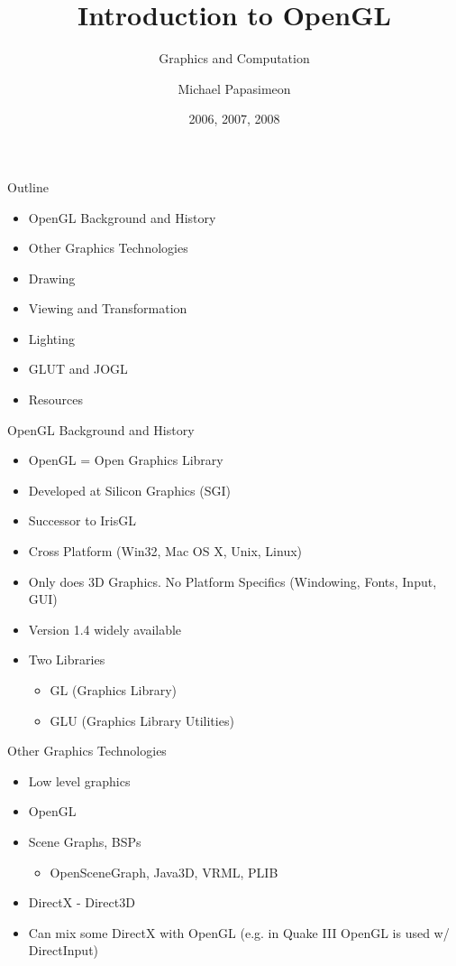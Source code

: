 \documentclass[xcolor=dvipsnames,t]{beamer}
\title[OpenGL]{Introduction to OpenGL}
\subtitle{Graphics and Computation}
\author{Michael Papasimeon} %
\date{2006, 2007, 2008}
\begin{document}
\begin{frame}
    \maketitle
\end{frame} 

\begin{frame}{Outline}
    \begin{itemize}
        \item OpenGL Background and History
        \item Other Graphics Technologies
        \item Drawing
        \item Viewing and Transformation
        \item Lighting
        \item GLUT and JOGL
        \item Resources
    \end{itemize} 
\end{frame}

\begin{frame}{OpenGL Background and History} 
    \begin{itemize}
        \item OpenGL = Open Graphics Library
        \item Developed at Silicon Graphics (SGI)
        \item Successor to IrisGL
        \item Cross Platform (Win32, Mac OS X, Unix, Linux)
        \item Only does 3D Graphics. No Platform Specifics (Windowing, Fonts, Input, GUI)
        \item Version 1.4 widely available
        \item Two Libraries
        \begin{itemize}
            \item GL (Graphics Library)
            \item GLU (Graphics Library Utilities)
        \end{itemize} 
    \end{itemize} 
\end{frame} 

\begin{frame}{Other Graphics Technologies} 
    \begin{itemize}
        \item Low level graphics
        \item OpenGL
        \item Scene Graphs, BSPs
            \begin{itemize}
                \item OpenSceneGraph, Java3D, VRML, PLIB
            \end{itemize} 
        \item DirectX - Direct3D
        \item Can mix some DirectX with OpenGL (e.g. in Quake III OpenGL is used w/ DirectInput)
    \end{itemize} 
\end{frame} 
\end{document}
